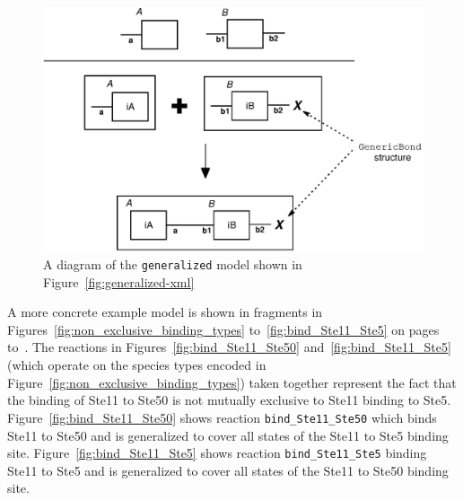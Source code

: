 \documentclass{cekarticle}
\begin{document}
\begin{figure}[h]
  \vspace*{8pt}
  \centering
  \includegraphics[scale = 0.7]{generalized.eps}
  \caption{A diagram of the \texttt{generalized} model shown in Figure~\ref{fig:generalized-xml}}
  \label{fig:generalized}
\end{figure}

A more concrete example model is shown in fragments in Figures~\ref{fig:non_exclusive_binding_types}
to~\ref{fig:bind_Ste11_Ste5}
on pages~\pageref{fig:non_exclusive_binding_types} to~\pageref{fig:bind_Ste11_Ste5}.
The reactions in Figures~\ref{fig:bind_Ste11_Ste50} and~\ref{fig:bind_Ste11_Ste5}
(which operate on the species types encoded in Figure~\ref{fig:non_exclusive_binding_types})
taken together represent the fact that the binding of
Ste11 to Ste50 is not mutually exclusive to Ste11 binding to Ste5.
Figure~\ref{fig:bind_Ste11_Ste50} shows reaction \texttt{bind\_Ste11\_Ste50} which binds Ste11 to
Ste50 and is generalized to cover all states of the Ste11 to Ste5 binding site.
Figure~\ref{fig:bind_Ste11_Ste5} shows reaction \texttt{bind\_Ste11\_Ste5} binding Ste11 to
Ste5 and is generalized to cover all states of the Ste11 to Ste50 binding site.
\end{document}
